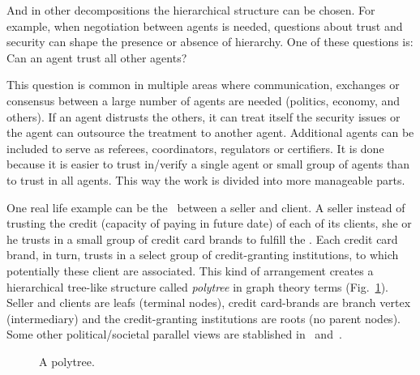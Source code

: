 \documentclass[../main.tex]{subfiles}
\begin{document}
And in other decompositions the hierarchical structure can be chosen.
For example, when negotiation between agents is needed, questions about trust and security can shape the presence or absence of hierarchy.
One of these questions is: Can an agent trust all other agents?

This question is common in multiple areas where communication, exchanges or consensus between a large number of agents are needed (politics, economy, and others).
If an agent distrusts the others, it can treat itself the security issues or the agent can outsource the treatment to another agent.
Additional agents can be included to serve as referees, coordinators, regulators or certifiers. It is done because it is easier to trust in/verify a single agent or small group of agents than to trust in all agents. This way the work is divided into more manageable parts.

One real life example can be the \EFT\ between a seller and client. A seller instead of trusting the credit (capacity of paying in future date) of each of its clients, she or he trusts in a small group of credit card brands to fulfill the \EFT{}.
Each credit card brand, in turn, trusts in a select group of credit-granting institutions, to which potentially these client are associated.
This kind of arrangement creates a hierarchical tree-like structure called \emph{polytree} in graph theory terms (Fig.~\ref{fig:polytree_topology}). Seller and clients are leafs (terminal nodes), credit card-brands are branch vertex (intermediary) and the credit-granting institutions are roots (no parent nodes).
Some other political/societal parallel views are stablished in~\cite{McNamaraEtAl2018} and~\cite{OlaruEtAl2018}.
\begin{figure}[h]
  \centering
  \caption{A polytree.}\label{fig:polytree_topology}
\end{figure}
\end{document}
